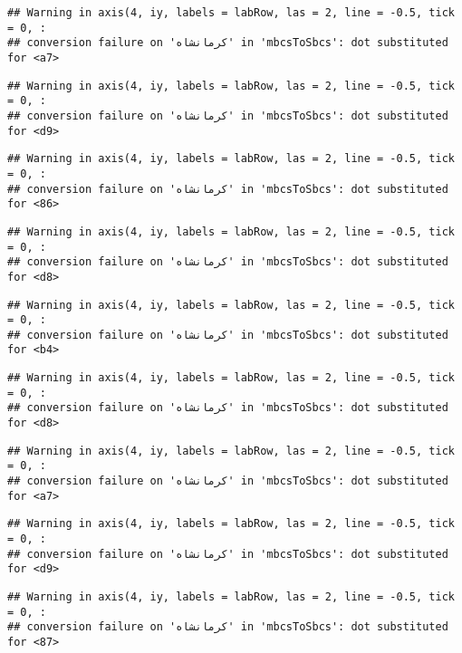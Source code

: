 \documentclass[
]{article}
\begin{document}
\begin{verbatim}
## Warning in axis(4, iy, labels = labRow, las = 2, line = -0.5, tick = 0, :
## conversion failure on 'کرمانشاه' in 'mbcsToSbcs': dot substituted for <a7>
\end{verbatim}

\begin{verbatim}
## Warning in axis(4, iy, labels = labRow, las = 2, line = -0.5, tick = 0, :
## conversion failure on 'کرمانشاه' in 'mbcsToSbcs': dot substituted for <d9>
\end{verbatim}

\begin{verbatim}
## Warning in axis(4, iy, labels = labRow, las = 2, line = -0.5, tick = 0, :
## conversion failure on 'کرمانشاه' in 'mbcsToSbcs': dot substituted for <86>
\end{verbatim}

\begin{verbatim}
## Warning in axis(4, iy, labels = labRow, las = 2, line = -0.5, tick = 0, :
## conversion failure on 'کرمانشاه' in 'mbcsToSbcs': dot substituted for <d8>
\end{verbatim}

\begin{verbatim}
## Warning in axis(4, iy, labels = labRow, las = 2, line = -0.5, tick = 0, :
## conversion failure on 'کرمانشاه' in 'mbcsToSbcs': dot substituted for <b4>
\end{verbatim}

\begin{verbatim}
## Warning in axis(4, iy, labels = labRow, las = 2, line = -0.5, tick = 0, :
## conversion failure on 'کرمانشاه' in 'mbcsToSbcs': dot substituted for <d8>
\end{verbatim}

\begin{verbatim}
## Warning in axis(4, iy, labels = labRow, las = 2, line = -0.5, tick = 0, :
## conversion failure on 'کرمانشاه' in 'mbcsToSbcs': dot substituted for <a7>
\end{verbatim}

\begin{verbatim}
## Warning in axis(4, iy, labels = labRow, las = 2, line = -0.5, tick = 0, :
## conversion failure on 'کرمانشاه' in 'mbcsToSbcs': dot substituted for <d9>
\end{verbatim}

\begin{verbatim}
## Warning in axis(4, iy, labels = labRow, las = 2, line = -0.5, tick = 0, :
## conversion failure on 'کرمانشاه' in 'mbcsToSbcs': dot substituted for <87>
\end{verbatim}
\end{document}
